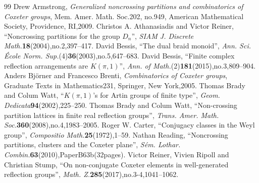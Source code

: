 \documentclass[10pt,a4paper]{amsart}
\begin{document}
\begin{thebibliography}{99}
 Drew Armstrong, \emph{Generalized noncrossing partitions and combinatorics of Coxeter groups}, Mem. Amer. Math. Soc.202, no.949, American Mathematical Society, Providence, RI,2009.
 Christos A. Athanasiadis and Victor Reiner, ``Noncrossing partitions for the group $D_n$'', \emph{SIAM J. Discrete Math.}\textbf{18}(2004),no.2,397--417.
 David Bessis, ``The dual braid monoid'', \emph{Ann. Sci. \'Ecole Norm. Sup.}(4)\textbf{36}(2003),no.5,647--683.
 David Bessis, ``Finite complex reflection arrangements are $K(\pi,1)$'', \emph{Ann. of Math.}(2)\textbf{181}(2015),no.3,809--904.
 Anders Bj\"orner and Francesco Brenti, \emph{Combinatorics of Coxeter groups}, Graduate Texts in Mathematics231, Springer, New York,2005.
 Thomas Brady and Colum Watt, ``$K(\pi,1)$'s for Artin groups of finite type'', \emph{Geom. Dedicata}\textbf{94}(2002),225--250.
 Thomas Brady and Colum Watt, ``Non-crossing partition lattices in finite real reflection groups'', \emph{Trans. Amer. Math. Soc.}\textbf{360}(2008),no.4,1983--2005.
 Roger W. Carter, ``Conjugacy classes in the Weyl group'', \emph{Compositio Math.}\textbf{25}(1972),1--59.
 Nathan Reading, ``Noncrossing partitions, clusters and the Coxeter plane'', \emph{S\'em. Lothar. Combin.}\textbf{63}(2010),PaperB63b(32pages).
 Victor Reiner, Vivien Ripoll and Christian Stump, ``On non-conjugate Coxeter elements in well-generated reflection groups'', \emph{Math. Z.}\textbf{285}(2017),no.3-4,1041--1062.
\end{thebibliography}
\end{document}
